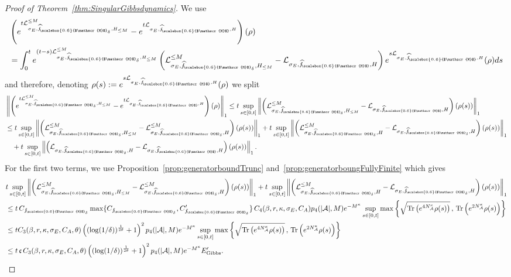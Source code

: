 \documentclass[11pt]{amsart}
\newcommand{\nn}{\nonumber}
\newcommand{\1}{\mathbbm{1}}
\newcommand{\Tr}{\operatorname{Tr}}
\newcommand{\cL}{\mathcal{L}}
\newcommand{\NA}{N_{\mathcal{A}}}
\newcommand{\cA}{\mathcal{A}}
\newcommand{\hatfM}{\widehat{f}_{\!\scalebox{0.6}{$\mathscr{M}$}}
}
\newcommand{\hatfMdelta}{\widehat{f}_{\!\scalebox{0.6}{$\mathscr{M}$}_\delta}}
\newcommand{\fMdelta}{f_{\!\scalebox{0.6}{$\mathscr{M}$}_\delta}}
\theoremstyle{plain}
\theoremstyle{definition}
\theoremstyle{remark}
\numberwithin{equation}{section}
\begin{document}
\begin{proof}[Proof of Theorem~\ref{thm:SingularGibbsdynamics}]

We use
\begin{align*}
   & \left(e^{t\cL^{\le M}_{\sigma_E,\hatfMdelta,H_{\le M}}} -e^{t\cL_{\sigma_E,\hatfM,H}}\right)(\rho) \\&= \int_0^t e^{(t-s)\cL^{\le M}_{\sigma_E,\hatfMdelta,H_{\le M}}}\left(\cL^{\le M}_{\sigma_E,\hatfMdelta,H_{\le M}} -\cL_{\sigma_E,\hatfM,H}\right)e^{s\cL_{\sigma_E,\hatfM,H}}(\rho)ds
\end{align*}
and therefore, denoting $\rho(s) :=e^{s\cL_{\sigma_E,\hatfM,H}}(\rho)$ we split
\begin{align}
\label{eq:MoreTriangle}
\nn&\left\|\left(e^{t\cL^{\le M}_{\sigma_E,\hatfMdelta,H_{\le M}}} -e^{t\cL_{\sigma_E,\hatfM,H}}\right)(\rho)\right\|_1  \le   t\sup_{s\in[0,t]}\left\|\left(\cL^{\le M}_{\sigma_E,\hatfMdelta,H_{\le M}}-\cL_{\sigma_E,\hatfM,H}\right)(\rho(s))\right\|_1 \\&\nn\le t\sup_{s\in[0,t]}\left\|\left(\cL^{\le M}_{\sigma_E,\hatfMdelta,H_{\le M}}-\cL^{\le M}_{\sigma_E,\hatfMdelta,H}\right)(\rho(s))\right\|_1 +t\sup_{s\in[0,t]}\left\|\left(\cL^{\le M}_{\sigma_E,\hatfMdelta,H}-\cL_{\sigma_E,\hatfMdelta,H}\right)(\rho(s))\right\|_1\\&\quad+t\sup_{s\in[0,t]}\left\|\left(\cL_{\sigma_E,\hatfMdelta,H}-\cL_{\sigma_E,\hatfM,H}\right)(\rho(s))\right\|_1.
\end{align}
For the first two terms, we use Proposition~\ref{prop:generatorboundTrunc} and~\ref{prop:generatorboungFullyFinite} which gives 
\begin{align*}
    &t\sup_{s\in[0,t]}\left\|\left(\cL^{\le M}_{\sigma_E,\hatfMdelta,H_{\le M}}-\cL^{\le M}_{\sigma_E,\hatfMdelta,H}\right)(\rho(s))\right\|_1 +t\sup_{s\in[0,t]}\left\|\left(\cL^{\le M}_{\sigma_E,\hatfMdelta,H}-\cL_{\sigma_E,\hatfMdelta,H}\right)(\rho(s))\right\|_1\\&\le t \,C_{\fMdelta}\max\{C_{\fMdelta},C'_{\fMdelta}\}\,C_4(\beta,r,\kappa,\sigma_E,C_A) p_4(|\cA|,M)e^{-M^\kappa} \sup_{s\in[0,t]}\max\left\{\sqrt{\Tr\left(e^{4\NA^\kappa}\rho(s)\right)}\,,\, \Tr\left(e^{2\NA^\kappa}\rho(s)\right) \right\}\\&\le t C_3(\beta,r,\kappa,\sigma_E,C_A,\theta) \left((\log(1/\delta))^{\frac{1}{2\theta}} +1\right)^2 p_4(|\cA|,M)e^{-M^\kappa} \sup_{s\in[0,t]}\max\left\{\sqrt{\Tr\left(e^{4\NA^\kappa}\rho(s)\right)}\,,\, \Tr\left(e^{2\NA^\kappa}\rho(s)\right) \right\}
     \\&\le t\,\mathfrak{c}\,C_3(\beta,r,\kappa,\sigma_E,C_A,\theta) \left((\log(1/\delta))^{\frac{1}{2\theta}} +1\right)^2 p_4(|\mathcal{A}|,M) e^{-M^\kappa} E'_{\operatorname{Gibbs}}.

\end{align*}
\end{proof}
\end{document}
